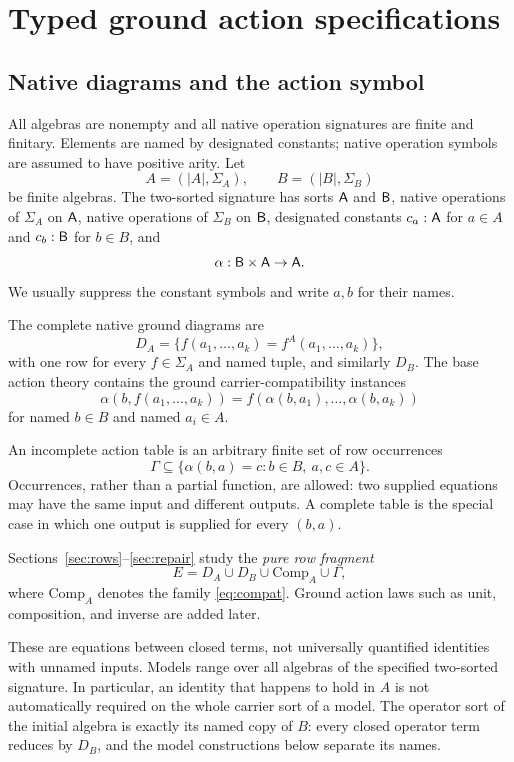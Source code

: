 \section{Typed ground action specifications}\label{sec:setup}

\subsection{Native diagrams and the action symbol}

All algebras are nonempty and all native operation signatures are finite and finitary.  Elements are named by designated constants; native operation symbols are assumed to have positive arity.  Let
\[
A=(|A|,\Sigma_A),\qquad B=(|B|,\Sigma_B)
\]
be finite algebras.  The two-sorted signature has sorts $\mathsf{A}$ and $\mathsf{B}$, native operations of $\Sigma_A$ on $\mathsf{A}$, native operations of $\Sigma_B$ on $\mathsf{B}$, designated constants $c_a:\mathsf{A}$ for $a\in A$ and $c_b:\mathsf{B}$ for $b\in B$, and
\[
\alpha:\mathsf{B}\times\mathsf{A}\to\mathsf{A}.
\]
We usually suppress the constant symbols and write $a,b$ for their names.

The complete native ground diagrams are
\[
D_A=\{f(a_1,\ldots,a_k)=f^A(a_1,\ldots,a_k)\},
\]
with one row for every $f\in\Sigma_A$ and named tuple, and similarly $D_B$.  The base action theory contains the ground carrier-compatibility instances
\begin{equation}\label{eq:compat}
\alpha(b,f(a_1,\ldots,a_k))
=
f(\alpha(b,a_1),\ldots,\alpha(b,a_k))
\end{equation}
for named $b\in B$ and named $a_i\in A$.

An incomplete action table is an arbitrary finite set of row occurrences
\begin{equation}\label{eq:rows}
\Gamma\subseteq
\{\alpha(b,a)=c:b\in B,\ a,c\in A\}.
\end{equation}
Occurrences, rather than a partial function, are allowed: two supplied equations may have the same input and different outputs.  A complete table is the special case in which one output is supplied for every $(b,a)$.

Sections~\ref{sec:rows}--\ref{sec:repair} study the \emph{pure row fragment}
\[
E=D_A\cup D_B\cup\mathrm{Comp}_A\cup\Gamma,
\]
where $\mathrm{Comp}_A$ denotes the family \eqref{eq:compat}.  Ground action laws such as unit, composition, and inverse are added later.

These are equations between closed terms, not universally quantified
identities with unnamed inputs. Models range over all algebras of the
specified two-sorted signature. In particular, an identity that happens to
hold in $A$ is not automatically required on the whole carrier sort of a
model. The operator sort of the initial algebra is exactly its named copy
of $B$: every closed operator term reduces by $D_B$, and the model
constructions below separate its names.


